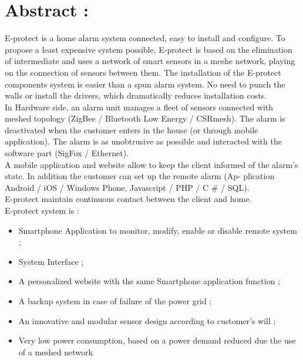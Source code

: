 \chapter{Abstract :}

E-protect is a home alarm system connected, easy to install and configure. To propose a least expensive system possible, E-protect is based on the elimination of intermediate and uses a network of smart sensors in a meshe network, playing on the connection of sensors between them. The installation of the E-protect components system is easier than a spun alarm system. No need to punch the walls or install the drivers, which dramatically reduces installation costs.\\

In Hardware side, an alarm unit manages a fleet of sensors connected with meshed topology (ZigBee / Bluetooth Low Energy / CSRmesh). The alarm is deactivated when the customer enters in the house (or through mobile application). The alarm is as unobtrusive as possible and interacted with the software part (SigFox / Ethernet).\\

A mobile application and website allow to keep the client informed of the alarm's state. In addition the customer can set up the remote alarm (Ap- plication Android / iOS / Windows Phone, Javascript / PHP / C \# / SQL).\\

E-protect maintain continuous contact between the client and home.\\

E-protect system is :\\

\begin{itemize}
\item Smartphone Application to monitor, modify, enable or disable remote system ;
\item System Interface ;
\item A personalized website with the same Smartphone application function ;
\item A backup system in case of failure of the power grid ;
\item An innovative and modular sensor design according to customer's will ;
\item Very low power consumption, based on a power demand reduced due the use of a meshed network\\
\end{itemize}
